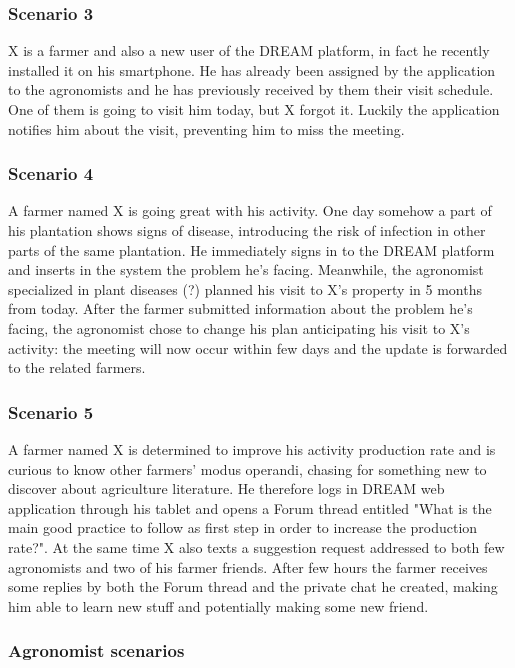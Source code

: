 \subsubsection*{Scenario 3}
X is a farmer and also a new user of the DREAM platform, in fact he recently installed it on his smartphone. He has already been assigned by the application to the agronomists and he has previously received by them their visit schedule. One of them is going to visit him today, but X forgot it. Luckily the application notifies him about the visit, preventing him to miss the meeting.

\subsubsection*{Scenario 4}
A farmer named X is going great with his activity. One day somehow a part of his plantation shows signs of disease, introducing the risk of infection in other parts of the same plantation. He immediately signs in to the DREAM platform and inserts in the system the problem he's facing. Meanwhile, the agronomist specialized in plant diseases (?) planned his visit to X's property in 5 months from today. After the farmer submitted information about the problem he's facing, the agronomist chose to change his plan anticipating his visit to X's activity: the meeting will now occur within few days and the update is forwarded to the related farmers.

\subsubsection*{Scenario 5}
A farmer named X is determined to improve his activity production rate and is curious to know other farmers' modus operandi, chasing for something new to discover about agriculture literature. He therefore logs in DREAM web application through his tablet and opens a Forum thread entitled "What is the main good practice to follow as first step in order to increase the production rate?". At the same time X also texts a suggestion request addressed to both few agronomists and two of his farmer friends. After few hours the farmer receives some replies by both the Forum thread and the private chat he created, making him able to learn new stuff and potentially making some new friend.

\subsubsection{Agronomist scenarios}
